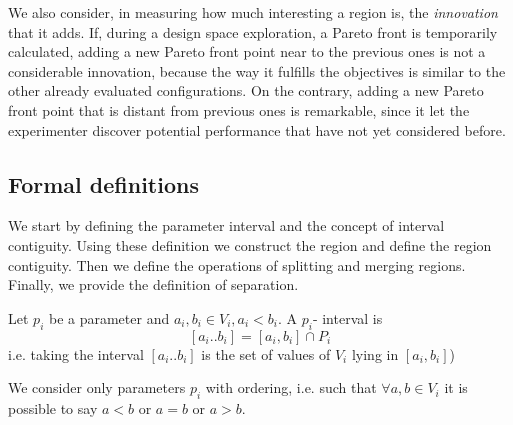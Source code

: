 We also consider, in measuring how much interesting a region is, the
\emph{innovation} that it adds. If, during a design space exploration,
a Pareto front is temporarily calculated, adding a new Pareto front
point near to the previous ones is not a considerable innovation,
because the way it fulfills the objectives is similar to the other
already evaluated configurations. On the contrary, adding a new Pareto
front point that is distant from previous ones is remarkable,
since it let the experimenter discover potential performance that have not yet considered before.

\subsection{Formal definitions}
We start by defining the parameter interval and the concept of interval contiguity. Using these definition we construct the region and define the region contiguity. Then we define the operations of splitting and merging regions. Finally, we provide the definition of separation.

\begin{definition} Let $p_{i}$ be a parameter and $a_{i},b_{i}\in V_{i},a_{i}<b_{i}$.
A $p_{i}$- interval is
\[
\left[a_{i}..b_{i}\right]=\left[a_{i},b_{i}\right]\cap P_{i}
\]
i.e. taking the interval $\left[a_{i}..b_{i}\right]$
is the set of values of $V_{i}$ lying in $\left[a_{i},b_{i}\right]$)
\end{definition}

We consider only parameters $p_{i}$ with ordering, i.e. such
that $\forall a,b\in V_{i}$ it is possible
to say $a<b$ or $a=b$ or $a>b$.



